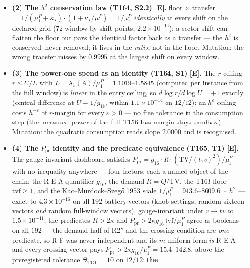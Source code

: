 \documentclass[11pt]{article}
\providecommand{\mE}{\textbf{[E]}}\providecommand{\mC}{\textbf{[C]}}
\begin{document}
\begin{itemize}[leftmargin=1.5em]
($2.2\times10^{-11}$ on $432$ points); candidate (i) settled in closed form ---
full-space $\mu_0=0$ exactly, strictly worse. Mutation: the wrong transport map
(the $x$-coordinates instead of the $a$-direction) moves the ratio by
$2.0\times10^{2}$--$5.4\times10^{3}$.
\item \textbf{(2) The $h^2$ conservation law (T164, S2.2) \mE.} floor $\times$
transfer $=1/(\mu^P_1+\kappa_s)\cdot(1+\kappa_s/\mu^P_1)=1/\mu^P_1$
\emph{identically} at every shift on the declared grid ($72$ window-by-shift points,
$2.2\times10^{-16}$): a sector shift can flatten the floor but pays the identical
factor back as a transfer --- the $h^2$ is conserved, never removed; it lives in the
\emph{ratio}, not in the floor. Mutation: the wrong transfer misses by $0.9995$ at
the largest shift on every window.
\item \textbf{(3) The power-one spend as an identity (T164, S1) \mE.} The $r$-ceiling
$r\le U/L$ with $L=\lambda_1(A)/\mu^P_1=1.1019$--$1.5845$ (computed per instance from
the full window) is \emph{linear} in the entry ceiling, so $d\log r/d\log U=+1$
exactly (central difference at $U=1/g_{16}$, within $1.1\times10^{-14}$ on $12/12$):
an $h^{\varepsilon}$ ceiling costs $h^{-\varepsilon}$ of $r$-margin for every
$\varepsilon>0$ --- no free tolerance in the consumption step (the measured power of
the full T156 loss margin stays sandbox). Mutation: the quadratic consumption reads
slope $2.0000$ and is recognised.
\item \textbf{(4) The $P_{\mathrm{pr}}$ identity and the predicate equivalence
(T165, T1) \mE.} The gauge-invariant dashboard satisfies
$P_{\mathrm{pr}}=g_{16}\cdot R\cdot(\mathrm{TV}/(t_1v)^2)/\mu^P_1$ with no inequality
anywhere --- four factors, each a named object of the chain: the R-E-A quantifier
$g_{16}$, the demand $R=Q/\mathrm{TV}$, the T163 floor $\mathrm{tvf}\ge1$, and the
Kac--Murdock--Szeg\H{o} 1953 scale $1/\mu^P_1=943.6$--$8609.6\sim h^2$ --- exact to
$4.3\times10^{-16}$ on all $192$ battery vectors (knob settings, random
sixteen-vectors \emph{and} random full-window vectors), gauge-invariant under
$v\to tv$ to $1.5\times10^{-11}$; the predicates $R>2\kappa$ and
$P_{\mathrm{pr}}>2\kappa g_{16}\,\mathrm{tvf}/\mu^P_1$ agree as booleans on all
$192$ --- the demand half of R2$''$ and the crossing condition are \emph{one}
predicate, so R-F was never independent and its $m$-uniform form \emph{is} R-E-A ---
and every crossing vector pays $P_{\mathrm{pr}}>2\kappa g_{16}/\mu^P_1=15.4$--$142.8$,
above the preregistered tolerance $\Theta_{\mathrm{TOL}}=10$ on $12/12$: \textbf{the
}
\end{itemize}
\end{document}
